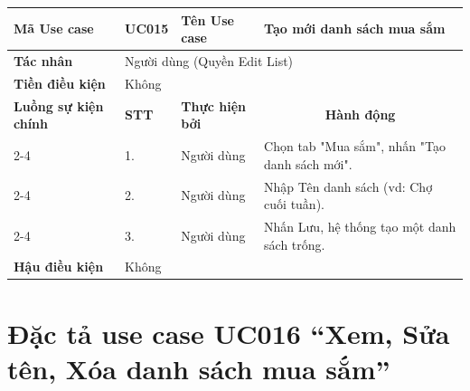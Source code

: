 \begin{longtable}{|p{2.7cm}|p{0.8cm}|p{2.6cm}|p{7.3cm}|}
\hline
\cellcolor[HTML]{D5F5E3}\textbf{Mã Use case} & \multicolumn{1}{l|}{UC015} & \cellcolor[HTML]{D5F5E3}\textbf{Tên Use case} & Tạo mới danh sách mua sắm \\ \hline
\cellcolor[HTML]{D5F5E3}\textbf{Tác nhân} & \multicolumn{3}{p{10.7cm}|}{Người dùng (Quyền Edit List)} \\ \hline
\cellcolor[HTML]{D5F5E3}\textbf{Tiền điều kiện} & \multicolumn{3}{p{10.7cm}|}{Không} \\ \hline

\cellcolor[HTML]{D5F5E3}\textbf{Luồng sự kiện chính} & \cellcolor[HTML]{FDEBD0}\textbf{STT} & \cellcolor[HTML]{FDEBD0}\textbf{Thực hiện bởi} & \multicolumn{1}{c|}{\cellcolor[HTML]{FDEBD0}\textbf{Hành động}} \\ \cline{2-4} 
\cellcolor[HTML]{D5F5E3} & 1. & Người dùng & Chọn tab "Mua sắm", nhấn "Tạo danh sách mới". \\ \cline{2-4} 
\cellcolor[HTML]{D5F5E3} & 2. & Người dùng & Nhập Tên danh sách (vd: Chợ cuối tuần). \\ \cline{2-4} 
\cellcolor[HTML]{D5F5E3} & 3. & Người dùng & Nhấn Lưu, hệ thống tạo một danh sách trống. \\ \hline

\cellcolor[HTML]{D5F5E3}\textbf{Hậu điều kiện} & \multicolumn{3}{p{10.7cm}|}{Không} \\ \hline
\end{longtable}
\endgroup

\section{Đặc tả use case UC016 ``Xem, Sửa tên, Xóa danh sách mua sắm''}
\vspace{0.5cm}

\begingroup
\renewcommand{\arraystretch}{1.5}

